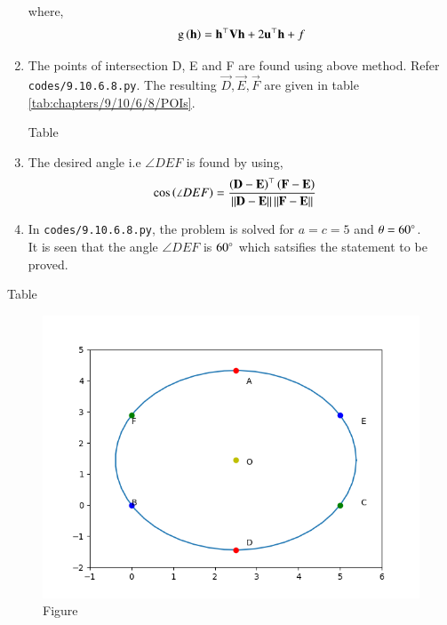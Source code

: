 \documentclass[journal,12pt,twocolumn]{IEEEtran}
\begin{document}
\begin{enumerate}
where,
\begin{align}
        \text{g}\left(\mathbf{h}\right) = \mathbf{h}^{\top}\mathbf{V}\mathbf{h} + 2\mathbf{u}^{\top}\mathbf{h} +f
\end{align}

\item The points of intersection D, E and F are found using above method. Refer \texttt{codes/9.10.6.8.py}. The resulting $ \vec{D} , \vec{E}, \vec{F}$ are given in table \ref{tab:chapters/9/10/6/8/POIs}. 
\begin{table}[h!]
\centering
	
        \caption{Table}		\label{tab:chapters/9/10/6/8/POIs}
\end{table}


\item The desired angle i.e $\angle DEF$ is found by using,
	\begin{align}
		\cos\left(\angle DEF\right) &= \frac{ \left(\mathbf{D}-\mathbf{E}\right)^{\top} \left( \mathbf{F}-\mathbf{E}\right) } { \left\lVert\mathbf{D}-\mathbf{E}\right\rVert \left\lVert\mathbf{F}-\mathbf{E}\right\rVert }
	\end{align}

\item In \texttt{codes/9.10.6.8.py}, the problem is solved for $a =c = 5$ and $ \theta = 60 \degree$.\\
	It is seen that the angle $\angle DEF$ is $ 60 \degree$ which satsifies the statement to be proved.
\end{enumerate}

\begin{table}[h!]
\centering
        
        \caption{Table}
        \label{tab:chapters/9/10/6/8/}
\end{table}

\begin{figure}[h]
  \centering
   \includegraphics[width=\linewidth,height = \linewidth]{chapters/9/10/6/8/figs/Figure_1.png}
   \caption{Figure}
   \label{fig:chapters/9/10/6/8/}
\end{figure}
\end{document}
